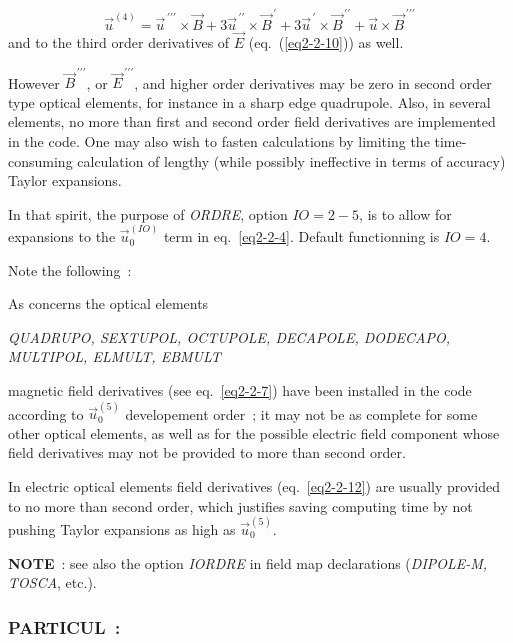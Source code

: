  $$ 
 \vec  u^{(4)} = \vec  u^{\,\prime\prime\prime}  \times  \vec  B 
 + 3\vec u^{\,\prime\prime}  \times  \vec  B^{\,\prime}  
 + 3\vec  u^{\,\prime}  \times \vec  B^{\,\prime\prime}  
 + \vec  u  \times   \vec  B^{\,\prime\prime\prime}
$$
%
 and to the third order derivatives of $ \vec  E $ (eq.~(\ref{eq2-2-10})) as well.

However  $ \vec  B^{\,\prime\prime\prime} $,  
or $ \vec  E^{\,\prime\prime\prime} $, and higher order derivatives  may be zero in second order type
optical elements, for instance in a sharp edge quadrupole. Also, in 
several elements, no more than  first and second order field 
derivatives  are implemented in the code.  One may also wish to fasten calculations by 
limiting the time-consuming calculation of lengthy (while possibly ineffective in terms 
of accuracy) Taylor expansions. 

\bigskip

\noindent In that spirit, the purpose of \textsl{ORDRE}, option $ IO=2-5$,  is to allow for 
expansions  to the  $ \vec  u^{(IO)}_0$ term  in eq.~\ref{eq2-2-4}. Default functionning 
is $IO=4$.

\bigskip

\noindent Note the following~: 

As concerns the optical elements
\begin{center}
	\textsl{QUADRUPO, SEXTUPOL, OCTUPOLE, DECAPOLE, DODECAPO,
	MULTIPOL, ELMULT, EBMULT}
\end{center}
 magnetic field derivatives (see eq.~\ref{eq2-2-7}) have been installed in the code according 
to $ \vec  u^{(5)}_0$ developement order~; it may not 
be as complete for some other optical elements, as well as for the 
 possible electric field  component whose field derivatives may not be provided 
 to more than second order. 

In electric optical elements field  derivatives (eq.~\ref{eq2-2-12}) are usually provided to no more than second 
order, which justifies saving computing time by not pushing Taylor expansions as high as  
$ \vec  u^{(5)}_0$. 


\bigskip

\noindent\textbf{NOTE}~: see also the option \textsl{IORDRE} in field map
declarations (\textsl{DIPOLE-M, TOSCA}, etc.).  
 \newpage

\subsubsection*{PARTICUL~: \PARTICULTitl}  \label{PARTICUL} 

